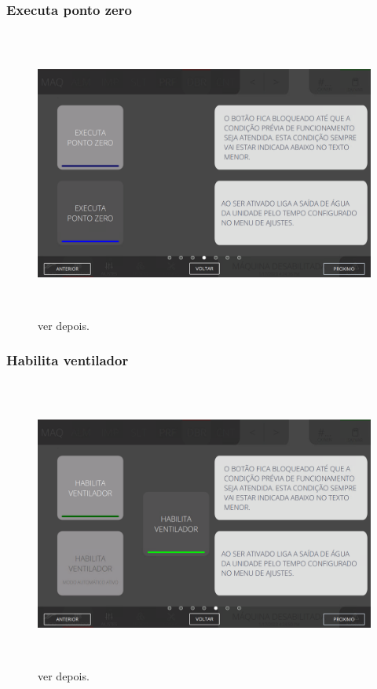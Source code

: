\newpage
\thispagestyle{fancy}
\vspace*{\fill}
\subsubsection{\small{Executa ponto zero}}
\begin{figure}[h]
  \centering
  \includegraphics[width=576px,height=360px]{src/images/07-fold/commands/e-4.png}
  \caption{ver depois.}
   \label{}
\end{figure}
\vspace*{\fill}

\newpage
\thispagestyle{fancy}
\vspace*{\fill}
\subsubsection{\small{Habilita ventilador}}
\begin{figure}[h]
  \centering
  \includegraphics[width=576px,height=360px]{src/images/07-fold/commands/e-5.png}
  \caption{ver depois.}
   \label{}
\end{figure}
\vspace*{\fill}

